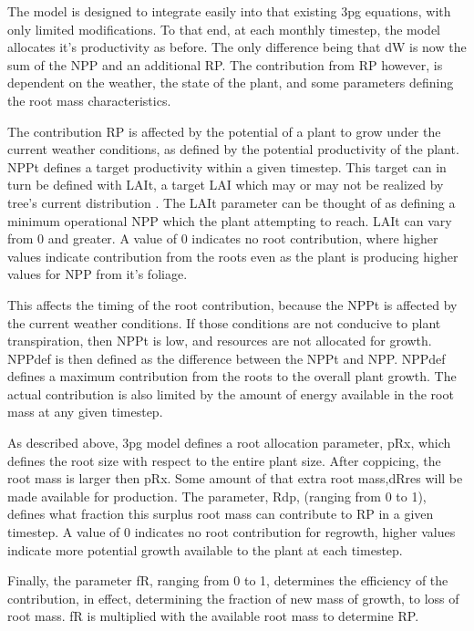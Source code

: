 \documentclass[10pt]{article}
\begin{document}
The model is designed to integrate easily into that existing \ac{3pg}
equations, with only limited modifications.  To that end, at each monthly
timestep, the model allocates it's productivity as before.  The only
difference being that \acf{dW} is now the sum of the \acf{NPP} and an
additional \acf{RP}.  The contribution from \ac{RP} however, is
dependent on the weather, the state of the plant, and some parameters
defining the root mass characteristics. 

The contribution \ac{RP} is affected by the potential of a plant to
grow under the current weather conditions, as defined by the potential
productivity of the plant.  \ac{NPPt} defines a target productivity
within a given timestep.  This target can in turn be defined with
\acs{LAIt}, a target \ac{LAI} which may or may not be realized by
tree's current distribution .  The \acs{LAIt} parameter can be thought
of as defining a minimum operational \acs{NPP} which the plant
attempting to reach.  \acs{LAIt} can vary from 0 and greater.  A value
of 0 indicates no root contribution, where higher values indicate
contribution from the roots even as the plant is producing higher
values for \acs{NPP} from it's foliage.

This affects the timing of the root contribution, because the
\ac{NPPt} is affected by the current weather conditions.  If those
conditions are not conducive to plant transpiration, then \ac{NPPt} is
low, and resources are not allocated for growth.  \ac{NPPdef} is then
defined as the difference between the \ac{NPPt} and
\ac{NPP}. \ac{NPPdef} defines a maximum contribution from the roots to
the overall plant growth.  The actual contribution is also limited by
the amount of energy available in the root mass at any given timestep.

As described above, \ac{3pg} model defines a root allocation
parameter, \acs{pRx}, which defines the root size with respect to the
entire plant size.  After coppicing, the root mass is larger then
\acs{pRx}.  Some amount of that extra root mass,\acs{dRres} will be
made available for production.  The parameter, \ac{Rdp}, (ranging from
0 to 1), defines what fraction this surplus root mass can contribute
to \ac{RP} in a given timestep.  A value of 0 indicates no root
contribution for regrowth, higher values indicate more potential
growth available to the plant at each timestep.

Finally, the parameter \acf{fR}, ranging from 0 to 1, determines the
efficiency of the contribution, in effect, determining the fraction of
new mass of growth, to loss of root mass.  \acs{fR} is multiplied with
the available root mass to determine \ac{RP}.
\end{document}
